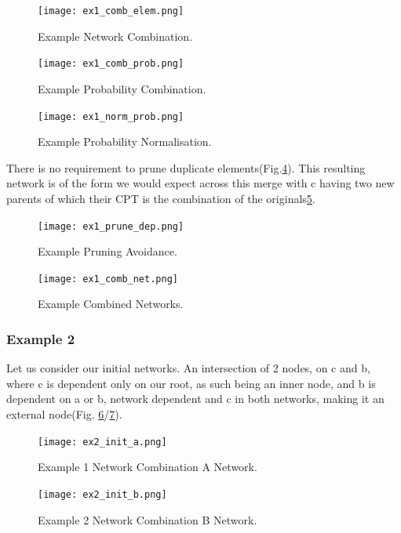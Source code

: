 \documentclass[10pt,a4paper]{article}
\begin{document}
\begin{figure}
\centering
  \texttt{[image: ex1\_comb\_elem.png]}
  \caption{Example Network Combination.}
  \label{fig:ex1_comb_elem}
\end{figure}

\begin{figure}
\centering
  \texttt{[image: ex1\_comb\_prob.png]}
  \caption{Example Probability Combination.}
  \label{fig:ex1_comb_prob}
\end{figure}

\begin{figure}
\centering
  \texttt{[image: ex1\_norm\_prob.png]}
  \caption{Example Probability Normalisation.}
  \label{fig:ex1_norm_prob}
\end{figure}


There is no requirement to prune duplicate elements(Fig.\ref{fig:ex1_prune_dep}). This resulting network is of the form we would expect across this merge with c having two new parents of which their CPT is the combination of the originals\ref{fig:ex1_comb_net}.

\begin{figure}
\centering
  \texttt{[image: ex1\_prune\_dep.png]}
  \caption{Example Pruning Avoidance.}
  \label{fig:ex1_prune_dep}
\end{figure}

\begin{figure}
\centering
  \texttt{[image: ex1\_comb\_net.png]}
  \caption{Example Combined Networks.}
  \label{fig:ex1_comb_net}
\end{figure}


\subsubsection{Example 2}

Let us consider our initial networks. An intersection of 2 nodes, on c and b, where c is dependent only on our root, as such being an inner node, and b is dependent on a or b, network dependent and c in both networks, making it an external node(Fig. \ref{fig:ex2_init_a}/\ref{fig:ex2_init_b}).
\begin{figure}
\centering
  \texttt{[image: ex2\_init\_a.png]}
  \caption{Example 1 Network Combination A Network.}
  \label{fig:ex2_init_a}
\end{figure}

\begin{figure}
\centering
  \texttt{[image: ex2\_init\_b.png]}
  \caption{Example 2 Network Combination B Network.}
  \label{fig:ex2_init_b}
\end{figure}
\end{document}
